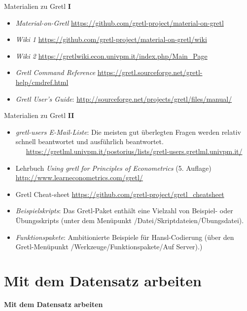 \documentclass{beamer}[11pt]
\begin{document}
\begin{frame}{Materialien zu Gretl \textbf{I}}
	\begin{itemize}
		\item \textit{Material-on-Gretl} \url{https://github.com/gretl-project/material-on-gretl}
		\item \textit{Wiki 1} \url{https://github.com/gretl-project/material-on-gretl/wiki}
		\item \textit{Wiki 2} \url{https://gretlwiki.econ.univpm.it/index.php/Main_Page}
		\item \textit{Gretl Command Reference} \url{https://gretl.sourceforge.net/gretl-help/cmdref.html}
		\item \textit{Gretl User's Guide}: \url{http://sourceforge.net/projects/gretl/files/manual/}
	\end{itemize}
\end{frame}

\begin{frame}{Materialien zu Gretl \textbf{II}}
	\begin{itemize}
		\item \textit{gretl-users E-Mail-Liste}: Die meisten gut überlegten Fragen werden relativ schnell beantwortet und ausführlich beantwortet.
		   \url{https://gretlml.univpm.it/postorius/lists/gretl-users.gretlml.univpm.it/}
		\item Lehrbuch \textit{Using gretl for Principles of Econometrics} (5. Auflage) \url{http://www.learneconometrics.com/gretl/}
		\item Gretl Cheat-sheet \url{https://github.com/gretl-project/gretl_cheatsheet}
		\item \textit{Beispielskripts}: Das Gretl-Paket enthält eine Vielzahl von Beispiel- oder Übungsskripts (unter dem Menüpunkt /Datei/Skriptdateien/Übungsdatei).
		\item \textit{Funktionspakete}: Ambitionierte Beispiele für Hansl-Codierung (über den Gretl-Menüpunkt /Werkzeuge/Funktionspakete/Auf Server).)
	\end{itemize}
\end{frame}


\section{Mit dem Datensatz arbeiten}


\begin{frame}
	\centering
	\LARGE
	\textbf{Mit dem Datensatz arbeiten}
\end{frame}
\end{document}
